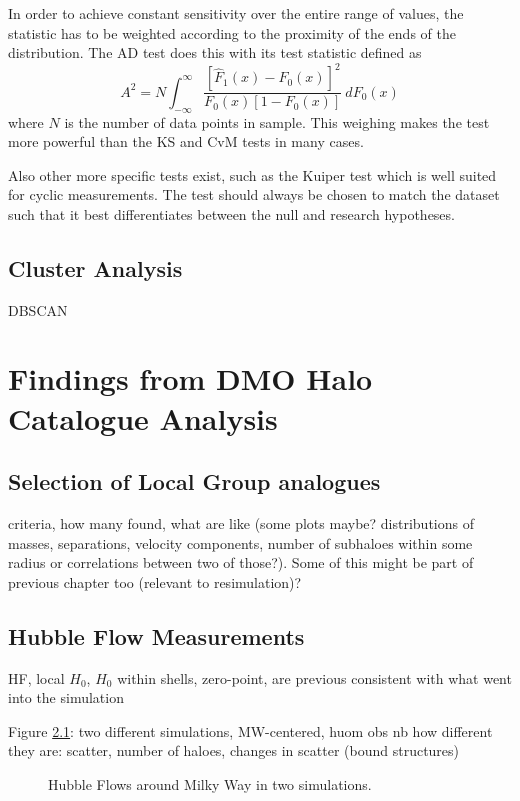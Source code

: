 \documentclass[english, oneside]{HYgradu}
\begin{document}
In order to achieve constant sensitivity over the entire range of values, the statistic has to be weighted according to the proximity of the ends of the distribution. The AD test does this with its test statistic defined as
\begin{equation}
	A^2 = N \int_{-\infty}^{\infty} \frac{[\hat F_1(x) - F_0(x)]^2}{F_0(x)[1-F_0(x)]}\ dF_0(x)
\end{equation}
where $N$ is the number of data points in sample. This weighing makes the test more powerful than the KS and CvM tests in many cases. \citep{bohm2010introduction, feigelson2012modern}

\reversemarginpar
{}
Also other more specific tests exist, such as the Kuiper test which is well suited for cyclic measurements. The test should always be chosen to match the dataset such that it best differentiates between the null and research hypotheses. \citep{bohm2010introduction, feigelson2012modern}

\section{Cluster Analysis}
DBSCAN

\chapter{Findings from DMO Halo Catalogue Analysis}
\section{Selection of Local Group analogues}
criteria, how many found, what are like (some plots maybe? distributions of masses, separations, velocity components, number of subhaloes within some radius or correlations between two of those?). Some of this might be part of previous chapter too (relevant to resimulation)?

\section{Hubble Flow Measurements}
HF, local $H_0$, $H_0$ within shells, zero-point, are previous consistent with what went into the simulation

Figure \ref{fig:hubblediagrams}: two different simulations, MW-centered, huom obs nb how different they are: scatter, number of haloes, changes in scatter (bound structures)

\begin{figure}
    \centering
    \def\svgwidth{\columnwidth}
    
    \caption{Hubble Flows around Milky Way in two simulations.}\label{fig:hubblediagrams}
\end{figure}
\end{document}

